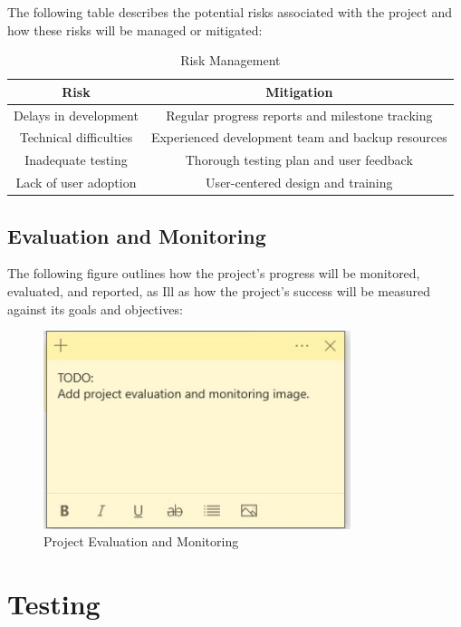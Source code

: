 \documentclass{article}
\begin{document}
The following table describes the potential risks associated with the project and how these risks will be managed or mitigated:

\begin{table}[htbp]
\centering
\caption{Risk Management}
\begin{tabular}{|c|c|}
\hline
\textbf{Risk} & \textbf{Mitigation} \\
\hline
Delays in development & Regular progress reports and milestone tracking \\
Technical difficulties & Experienced development team and backup resources \\
Inadequate testing & Thorough testing plan and user feedback \\
Lack of user adoption & User-centered design and training \\
\hline
\end{tabular}%
\label{tab:risk}%
\end{table}%

\subsection{Evaluation and Monitoring}

The following figure outlines how the project's progress will be monitored, evaluated, and reported, as Ill as how the project's success will be measured against its goals and objectives:

\begin{figure}[htbp]
\centering
\includegraphics[width=0.8\textwidth]{evaluation.jpg}
\caption{Project Evaluation and Monitoring}
\label{fig:evaluation}
\end{figure}
\newpage


\section{Testing}
\label{sec:testing}
\end{document}
